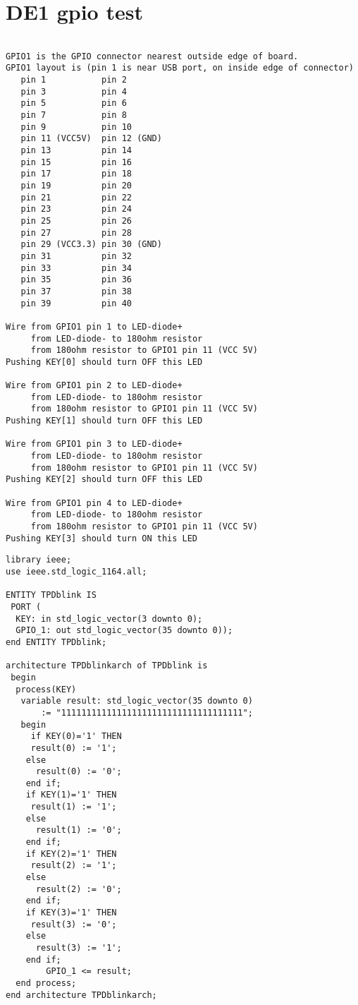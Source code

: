 \chapter{DE1 gpio test}

\begin{verbatim}

GPIO1 is the GPIO connector nearest outside edge of board.
GPIO1 layout is (pin 1 is near USB port, on inside edge of connector)
   pin 1           pin 2
   pin 3           pin 4
   pin 5           pin 6
   pin 7           pin 8
   pin 9           pin 10
   pin 11 (VCC5V)  pin 12 (GND)
   pin 13          pin 14
   pin 15          pin 16
   pin 17          pin 18
   pin 19          pin 20
   pin 21          pin 22
   pin 23          pin 24
   pin 25          pin 26
   pin 27          pin 28
   pin 29 (VCC3.3) pin 30 (GND)
   pin 31          pin 32
   pin 33          pin 34
   pin 35          pin 36
   pin 37          pin 38
   pin 39          pin 40

Wire from GPIO1 pin 1 to LED-diode+ 
     from LED-diode- to 180ohm resistor
     from 180ohm resistor to GPIO1 pin 11 (VCC 5V)
Pushing KEY[0] should turn OFF this LED

Wire from GPIO1 pin 2 to LED-diode+ 
     from LED-diode- to 180ohm resistor
     from 180ohm resistor to GPIO1 pin 11 (VCC 5V)
Pushing KEY[1] should turn OFF this LED

Wire from GPIO1 pin 3 to LED-diode+ 
     from LED-diode- to 180ohm resistor
     from 180ohm resistor to GPIO1 pin 11 (VCC 5V)
Pushing KEY[2] should turn OFF this LED

Wire from GPIO1 pin 4 to LED-diode+ 
     from LED-diode- to 180ohm resistor
     from 180ohm resistor to GPIO1 pin 11 (VCC 5V)
Pushing KEY[3] should turn ON this LED

\end{verbatim}
\begin{verbatim}
library ieee;
use ieee.std_logic_1164.all;

ENTITY TPDblink IS 
 PORT (
  KEY: in std_logic_vector(3 downto 0);
  GPIO_1: out std_logic_vector(35 downto 0));
end ENTITY TPDblink;

architecture TPDblinkarch of TPDblink is
 begin 
  process(KEY)
   variable result: std_logic_vector(35 downto 0) 
       := "111111111111111111111111111111111111";
   begin 
	 if KEY(0)='1' THEN
     result(0) := '1';
	else 
	  result(0) := '0';
	end if;
	if KEY(1)='1' THEN
     result(1) := '1';
	else 
	  result(1) := '0';
	end if;
	if KEY(2)='1' THEN
     result(2) := '1';
	else 
	  result(2) := '0';
	end if;
	if KEY(3)='1' THEN
     result(3) := '0';
	else 
	  result(3) := '1';
	end if;
        GPIO_1 <= result;
  end process;
end architecture TPDblinkarch;
\end{verbatim}
